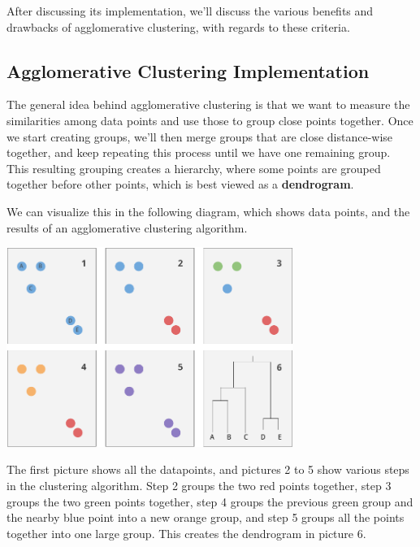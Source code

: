 \documentclass{article}
\begin{document}
After discussing its implementation, we'll discuss the various benefits and drawbacks of agglomerative clustering, with regards to these criteria.

\subsection{Agglomerative Clustering Implementation}

The general idea behind agglomerative clustering is that we want to measure the similarities among data points and use those to group close points together. Once we start creating groups, we'll then merge groups that are close distance-wise together, and keep repeating this process until we have one remaining group. This resulting grouping creates a hierarchy, where some points are grouped together before other points, which is best viewed as a \textbf{dendrogram}.

We can visualize this in the following diagram, which shows data points, and the results of an agglomerative clustering algorithm.

\begin{minipage}{\linewidth}
\begin{center}
\includegraphics[width=0.70\textwidth]{dendrogram2.png}
\end{center}
\end{minipage}

The first picture shows all the datapoints, and pictures 2 to 5 show various steps in the clustering algorithm. Step 2 groups the two red points together, step 3 groups the two green points together, step 4 groups the previous green group and the nearby blue point into a new orange group, and step 5 groups all the points together into one large group. This creates the dendrogram in picture 6.
\end{document}
